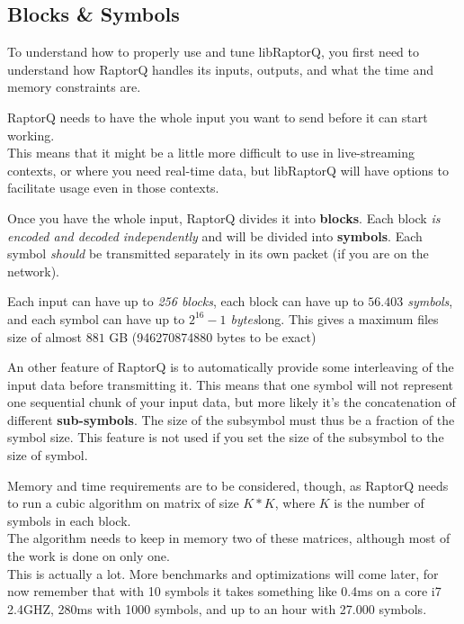 \documentclass[11pt,a4paper]{refart}
\begin{document}
\subsection{Blocks \& Symbols}

To understand how to properly use and tune libRaptorQ, you first need to understand how RaptorQ handles its inputs, outputs, and what the time and memory
constraints are.

RaptorQ needs to have the whole input you want to send before it can start working.\\
This means that it might be a little more difficult to use in live-streaming contexts, or where you need real-time data, but libRaptorQ will have options to
facilitate usage even in those contexts.

Once you have the whole input, RaptorQ divides it into \textbf{blocks}. Each block \textit{is encoded and decoded independently} and will be divided into \textbf{symbols}. Each symbol \textit{should}
be transmitted separately in its own packet (if you are on the network).

Each input can have up to \textit{256 blocks}, each block can have up to \textit{$56.403$ symbols}, and each
symbol can have up to \textit{$2^{16}-1$ bytes}long. This gives a maximum files size of almost $881$ GB (946270874880 bytes to be exact)

An other feature of RaptorQ is to automatically provide some interleaving of the input data before transmitting it. This means that one symbol will not
represent one sequential chunk of your input data, but more likely it's the concatenation of different \textbf{sub-symbols}. The size of the subsymbol must thus
be a fraction of the symbol size. This feature is not used if you set the size of the subsymbol to the size of symbol.


Memory and time requirements are to be considered, though, as RaptorQ needs to run a cubic algorithm on matrix of size $K*K$, where $K$ is the number of
symbols in each block.\\
The algorithm needs to keep in memory two of these matrices, although most of the work is done on only one.\\
This is actually a lot. More benchmarks and optimizations will come later, for now remember that with 10 symbols it takes something like 0.4ms on a core i7 2.4GHZ, 280ms with 1000 symbols, and up to an hour with 27.000 symbols.
\end{document}
